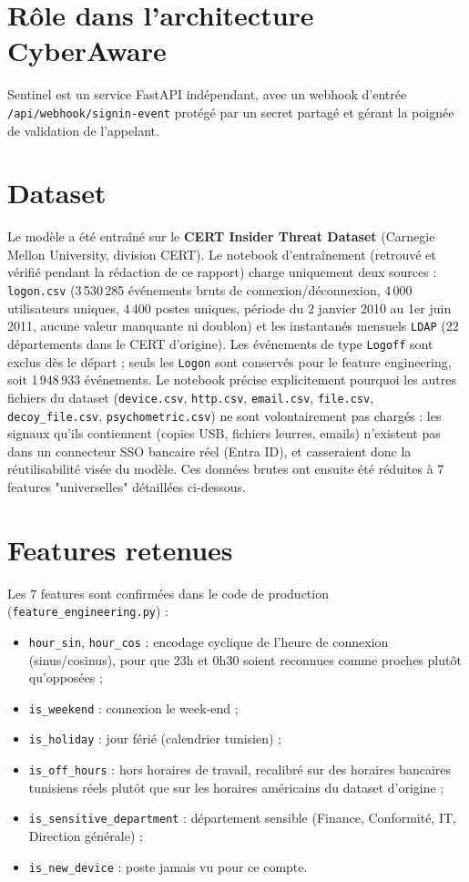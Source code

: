 \documentclass[12pt,a4paper]{report}
\begin{document}
\section{Rôle dans l'architecture CyberAware}

Sentinel est un service FastAPI indépendant, avec un webhook d'entrée \texttt{/api/webhook/signin-event} protégé par un secret partagé et gérant la poignée de validation de l'appelant.

\section{Dataset}

Le modèle a été entraîné sur le \textbf{CERT Insider Threat Dataset} (Carnegie Mellon University, division CERT). Le notebook d'entraînement (retrouvé et vérifié pendant la rédaction de ce rapport) charge uniquement deux sources : \texttt{logon.csv} (3\,530\,285 événements bruts de connexion/déconnexion, 4\,000 utilisateurs uniques, 4\,400 postes uniques, période du 2 janvier 2010 au 1er juin 2011, aucune valeur manquante ni doublon) et les instantanés mensuels \texttt{LDAP} (22 départements dans le CERT d'origine). Les événements de type \texttt{Logoff} sont exclus dès le départ ; seuls les \texttt{Logon} sont conservés pour le feature engineering, soit 1\,948\,933 événements. Le notebook précise explicitement pourquoi les autres fichiers du dataset (\texttt{device.csv}, \texttt{http.csv}, \texttt{email.csv}, \texttt{file.csv}, \texttt{decoy\_file.csv}, \texttt{psychometric.csv}) ne sont volontairement pas chargés : les signaux qu'ils contiennent (copies USB, fichiers leurres, emails) n'existent pas dans un connecteur SSO bancaire réel (Entra ID), et casseraient donc la réutilisabilité visée du modèle. Ces données brutes ont ensuite été réduites à 7 features "universelles" détaillées ci-dessous.

\section{Features retenues}

Les 7 features sont confirmées dans le code de production (\texttt{feature\_engineering.py}) :

\begin{itemize}[nosep]
\item \texttt{hour\_sin}, \texttt{hour\_cos} : encodage cyclique de l'heure de connexion (sinus/cosinus), pour que 23h et 0h30 soient reconnues comme proches plutôt qu'opposées ;
\item \texttt{is\_weekend} : connexion le week-end ;
\item \texttt{is\_holiday} : jour férié (calendrier tunisien) ;
\item \texttt{is\_off\_hours} : hors horaires de travail, recalibré sur des horaires bancaires tunisiens réels plutôt que sur les horaires américains du dataset d'origine ;
\item \texttt{is\_sensitive\_department} : département sensible (Finance, Conformité, IT, Direction générale) ;
\item \texttt{is\_new\_device} : poste jamais vu pour ce compte.
\end{itemize}
\end{document}
